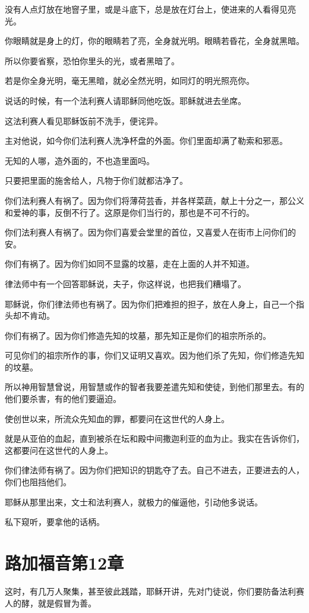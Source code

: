 \documentclass[12pt,oneside]{book}
\begin{document}
没有人点灯放在地窨子里，或是斗底下，总是放在灯台上，使进来的人看得见亮光。

你眼睛就是身上的灯，你的眼睛若了亮，全身就光明。眼睛若昏花，全身就黑暗。

所以你要省察，恐怕你里头的光，或者黑暗了。

若是你全身光明，毫无黑暗，就必全然光明，如同灯的明光照亮你。

说话的时候，有一个法利赛人请耶稣同他吃饭。耶稣就进去坐席。

这法利赛人看见耶稣饭前不洗手，便诧异。

主对他说，如今你们法利赛人洗净杯盘的外面。你们里面却满了勒索和邪恶。

无知的人哪，造外面的，不也造里面吗。

只要把里面的施舍给人，凡物于你们就都洁净了。

你们法利赛人有祸了。因为你们将薄荷芸香，并各样菜蔬，献上十分之一，那公义和爱神的事，反倒不行了。这原是你们当行的，那也是不可不行的。

你们法利赛人有祸了。因为你们喜爱会堂里的首位，又喜爱人在街市上问你们的安。

你们有祸了。因为你们如同不显露的坟墓，走在上面的人并不知道。

律法师中有一个回答耶稣说，夫子，你这样说，也把我们糟塌了。

耶稣说，你们律法师也有祸了。因为你们把难担的担子，放在人身上，自己一个指头却不肯动。

你们有祸了。因为你们修造先知的坟墓，那先知正是你们的祖宗所杀的。

可见你们的祖宗所作的事，你们又证明又喜欢。因为他们杀了先知，你们修造先知的坟墓。

所以神用智慧曾说，用智慧或作的智者我要差遣先知和使徒，到他们那里去。有的他们要杀害，有的他们要逼迫。

使创世以来，所流众先知血的罪，都要问在这世代的人身上。

就是从亚伯的血起，直到被杀在坛和殿中间撒迦利亚的血为止。我实在告诉你们，这都要问在这世代的人身上。

你们律法师有祸了。因为你们把知识的钥匙夺了去。自己不进去，正要进去的人，你们也阻挡他们。

耶稣从那里出来，文士和法利赛人，就极力的催逼他，引动他多说话。

私下窥听，要拿他的话柄。

\chapter{路加福音第12章}
这时，有几万人聚集，甚至彼此践踏，耶稣开讲，先对门徒说，你们要防备法利赛人的酵，就是假冒为善。
\end{document}
